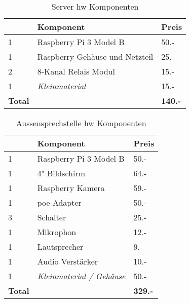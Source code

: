 \begin{table}[]
	\centering
	\label{my-label}
	\begin{tabular}{l|ll}
		\multicolumn{1}{r|}{} \textbf{Anzahl} & \textbf{Komponent} \hspace{180pt} & \textbf{Preis} 	\\ \hline
		1	&	Raspberry Pi 3 Model B						& 50.-				\\ \hline
		1	&	Raspberry Gehäuse und Netzteil				& 25.-			\\ \hline
		2	&	8-Kanal Relais Modul						& 15.-			\\ \hline
		1	&	\textit{Kleinmaterial}						& 15.-			\\ \hline
		\textbf{Total}	&									& \textbf{140.-}			\\ \hline
	\end{tabular}
	\caption{Server \gls{hw} Komponenten}
	\label{tbl:SrvHW}
\end{table}

\begin{table}[]
	\centering
	\label{my-label}
	\begin{tabular}{l|ll}
		\multicolumn{1}{r|}{} \textbf{Anzahl} & \textbf{Komponent} \hspace{180pt} & \textbf{Preis} 	\\ \hline
		1	&	Raspberry Pi 3 Model B		   				& 50.-			\\ \hline
		1	&	4" Bildschirm								& 64.-			\\ \hline
		1	&	Raspberry Kamera							& 59.-			\\ \hline
		1	&	\gls{poe} Adapter									& 50.-			\\ \hline
		3	&	Schalter									& 25.-			\\ \hline
		1	&	Mikrophon									& 12.-			\\ \hline
		1	&	Lautsprecher								& 9.-			\\ \hline
		1	&	Audio Verstärker							& 10.-			\\ \hline
		1	&	\textit{Kleinmaterial / Gehäuse}			& 50.-			\\ \hline
		\textbf{Total}	&									& \textbf{329.-}			\\ \hline
	\end{tabular}
	\caption{Aussensprechstelle \gls{hw} Komponenten}
	\label{tbl:DoorHW}
\end{table}

